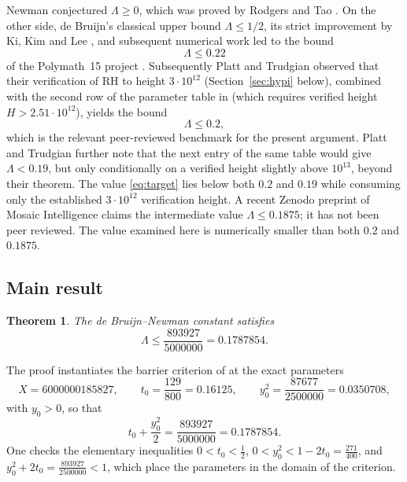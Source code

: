\documentclass[11pt]{article}
\newtheorem{theorem}{Theorem}[section]
\theoremstyle{definition}
\newcommand{\LB}{\Lambda}
\begin{document}
Newman conjectured $\LB\ge0$, which was proved by Rodgers and Tao
\cite{RodgersTao}. On the other side, de Bruijn's classical upper
bound $\LB\le1/2$, its strict improvement by Ki, Kim and Lee
\cite{KKL}, and subsequent numerical work led to the bound
\begin{equation}\label{eq:polymathbound}
\LB\le0.22
\end{equation}
of the Polymath~15 project \cite{Polymath}. Subsequently Platt and
Trudgian observed \cite[Corollary~2]{PlattTrudgian} that their
verification of RH to height $3\cdot10^{12}$
(Section~\ref{sec:hypi} below), combined with the second row of the
parameter table in \cite[Table~1, p.~65]{Polymath} (which requires
verified height $H>2.51\cdot10^{12}$), yields the bound
\begin{equation}\label{eq:ptbound}
\LB\le0.2 ,
\end{equation}
which is the relevant peer-reviewed benchmark for the present
argument. Platt and Trudgian further note
that the next entry of the same table would give $\LB<0.19$, but only
conditionally on a verified height slightly above $10^{13}$, beyond
their theorem.  The value \eqref{eq:target} lies below both
$0.2$ and $0.19$ while consuming only the established
$3\cdot10^{12}$ verification height. A recent Zenodo preprint of
Mosaic Intelligence \cite{Mosaic} claims the intermediate value
$\LB\le0.1875$; it has not been peer reviewed. The value examined here is
numerically smaller than both $0.2$ and $0.1875$.

\subsection{Main result}

\begin{theorem}\label{thm:main}
The de Bruijn--Newman constant satisfies
\[
\LB\le\frac{893927}{5000000}=0.1787854 .
\]
\end{theorem}

The proof instantiates the barrier criterion of
\cite[Theorem~1.2]{Polymath} at the exact parameters
\begin{equation}\label{eq:params}
X=6000000185827,\qquad
t_0=\frac{129}{800}=0.16125,\qquad
y_0^2=\frac{87677}{2500000}=0.0350708,
\end{equation}
with $y_0>0$, so that
\begin{equation}\label{eq:target}
t_0+\frac{y_0^2}{2}=\frac{893927}{5000000}=0.1787854 .
\end{equation}
One checks the elementary inequalities
$0<t_0<\tfrac12$, $0<y_0^2<1-2t_0=\tfrac{271}{400}$, and
$y_0^2+2t_0=\tfrac{893927}{2500000}<1$, which place the parameters in
the domain of the criterion.
\end{document}
